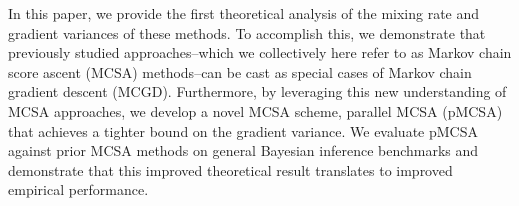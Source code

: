 
In this paper, we provide the first theoretical analysis of the mixing rate and gradient variances of these methods.
To accomplish this, we demonstrate that previously studied approaches--which we collectively here refer to as Markov chain score ascent (MCSA) methods--can be cast as special cases of Markov chain gradient descent (MCGD).
Furthermore, by leveraging this new understanding of MCSA approaches, we develop a novel MCSA scheme, parallel MCSA (pMCSA) that achieves a tighter bound on the gradient variance.
We evaluate pMCSA against prior MCSA methods on general Bayesian inference benchmarks and demonstrate that this improved theoretical result translates to improved empirical performance.



